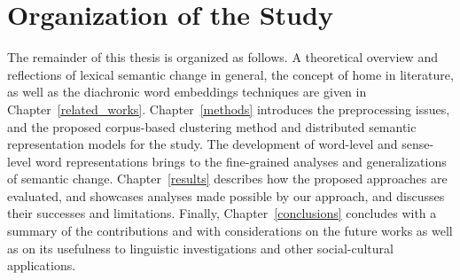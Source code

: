 \section{Organization of the Study}
The remainder of this thesis is organized as follows. A theoretical overview and reflections of lexical semantic change in general, the concept of home in literature, as well as the diachronic word embeddings techniques are given in Chapter~\ref{related_works}. Chapter~\ref{methods} introduces the preprocessing issues, and the proposed corpus-based clustering method and distributed semantic representation models for the study. The development of word-level and sense-level word representations brings to the fine-grained analyses and generalizations of semantic change. Chapter~\ref{results} describes how the proposed approaches are evaluated, and showcases analyses made possible by our approach, and discusses their successes and limitations. Finally, Chapter~\ref{conclusions} concludes with a summary of the contributions and with considerations on the future works as well as on its usefulness to linguistic investigations and other social-cultural applications.

